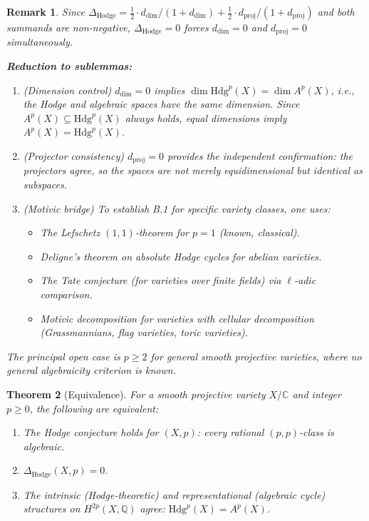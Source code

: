 \documentclass[11pt]{article}
\newtheorem{theorem}{Theorem}[section]
\newtheorem{remark}[theorem]{Remark}
\theoremstyle{definition}
\begin{document}
\begin{remark}
Since $\Delta_{\mathrm{Hodge}} = \tfrac{1}{2} \cdot d_{\mathrm{dim}}/(1 + d_{\mathrm{dim}}) + \tfrac{1}{2} \cdot d_{\mathrm{proj}}/(1 + d_{\mathrm{proj}})$ and both summands are non-negative, $\Delta_{\mathrm{Hodge}} = 0$ forces $d_{\mathrm{dim}} = 0$ and $d_{\mathrm{proj}} = 0$ simultaneously.

\medskip
\noindent\textbf{Reduction to sublemmas:}
\begin{enumerate}
  \item[\textbf{B.1}] \emph{(Dimension control)} $d_{\mathrm{dim}} = 0$ implies $\dim \mathrm{Hdg}^p(X) = \dim A^p(X)$, i.e., the Hodge and algebraic spaces have the same dimension. Since $A^p(X) \subseteq \mathrm{Hdg}^p(X)$ always holds, equal dimensions imply $A^p(X) = \mathrm{Hdg}^p(X)$.
  \item[\textbf{B.2}] \emph{(Projector consistency)} $d_{\mathrm{proj}} = 0$ provides the independent confirmation: the projectors agree, so the spaces are not merely equidimensional but identical as subspaces.
  \item[\textbf{B.3}] \emph{(Motivic bridge)} To establish B.1 for specific variety classes, one uses:
    \begin{itemize}
      \item The Lefschetz $(1,1)$-theorem for $p = 1$ (known, classical).
      \item Deligne's theorem on absolute Hodge cycles for abelian varieties.
      \item The Tate conjecture (for varieties over finite fields) via $\ell$-adic comparison.
      \item Motivic decomposition for varieties with cellular decomposition (Grassmannians, flag varieties, toric varieties).
    \end{itemize}
\end{enumerate}
The principal open case is $p \geq 2$ for general smooth projective varieties, where no general algebraicity criterion is known.
\end{remark}

\begin{theorem}[Equivalence]
\label{thm:hodge-equiv}
For a smooth projective variety $X/\mathbb{C}$ and integer $p \geq 0$, the following are equivalent:
\begin{enumerate}
  \item[(i)] The Hodge conjecture holds for $(X, p)$: every rational $(p,p)$-class is algebraic.
  \item[(ii)] $\Delta_{\mathrm{Hodge}}(X, p) = 0$.
  \item[(iii)] The intrinsic (Hodge-theoretic) and representational (algebraic cycle) structures on $H^{2p}(X, \mathbb{Q})$ agree: $\mathrm{Hdg}^p(X) = A^p(X)$.
\end{enumerate}
\end{theorem}
\end{document}
